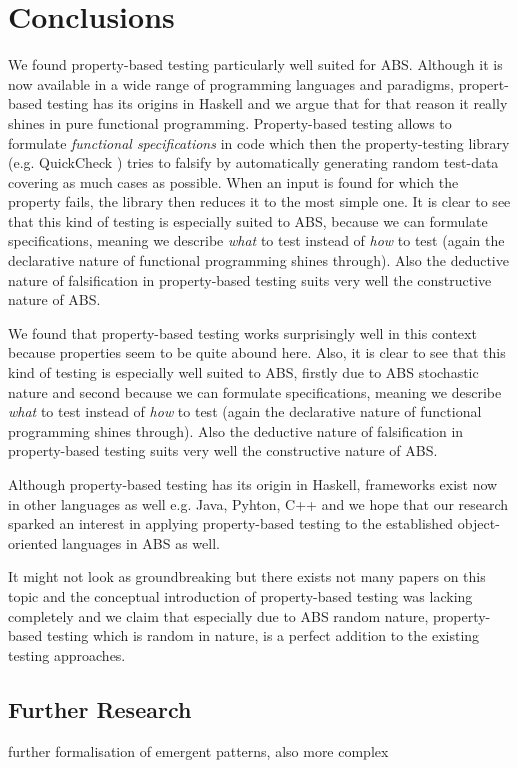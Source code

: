 \section{Conclusions}
\label{sec:conclusions}

We found property-based testing particularly well suited for ABS. Although it is now available in a wide range of programming languages and paradigms, propert-based testing has its origins in Haskell \cite{claessen_quickcheck_2000,claessen_testing_2002} and we argue that for that reason it really shines in pure functional programming. Property-based testing allows to formulate \textit{functional specifications} in code which then the property-testing library (e.g. QuickCheck \cite{claessen_quickcheck_2000}) tries to falsify by automatically generating random test-data covering as much cases as possible. When an input is found for which the property fails, the library then reduces it to the most simple one. It is clear to see that this kind of testing is especially suited to ABS, because we can formulate specifications, meaning we describe \textit{what} to test instead of \textit{how} to test (again the declarative nature of functional programming shines through). Also the deductive nature of falsification in property-based testing suits very well the constructive nature of ABS.

We found that property-based testing works surprisingly well in this context because properties seem to be quite abound here. Also, it is clear to see that this kind of testing is especially well suited to ABS, firstly due to ABS stochastic nature and second because we can formulate specifications, meaning we describe \textit{what} to test instead of \textit{how} to test (again the declarative nature of functional programming shines through). Also the deductive nature of falsification in property-based testing suits very well the constructive nature of ABS.

Although property-based testing has its origin in Haskell, frameworks exist now in other languages as well e.g. Java, Pyhton, C++ and we hope that our research sparked an interest in applying property-based testing to the established object-oriented languages in ABS as well. 

It might not look as groundbreaking but there exists not many papers on this topic and the conceptual introduction of property-based testing was lacking completely and we claim that especially due to ABS random nature, property-based testing which is random in nature, is a perfect addition to the existing testing approaches.

\subsection{Further Research}
\label{sec:further}
further formalisation of emergent patterns, also more complex